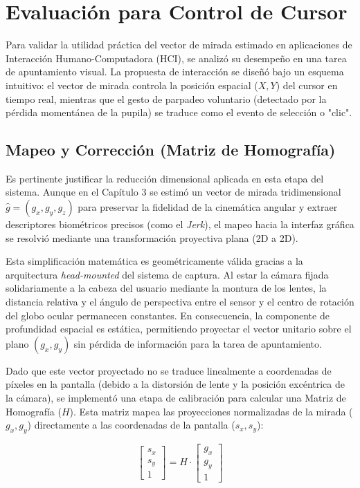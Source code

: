 \section{Evaluación para Control de Cursor}

Para validar la utilidad práctica del vector de mirada estimado en aplicaciones de Interacción Humano-Computadora (HCI), se analizó su desempeño en una tarea de apuntamiento visual.
La propuesta de interacción se diseñó bajo un esquema intuitivo: el vector de mirada controla la posición espacial ($X, Y$) del cursor en tiempo real, mientras que el gesto de parpadeo voluntario (detectado por la pérdida momentánea de la pupila) se traduce como el evento de selección o "clic".

\subsection{Mapeo y Corrección (Matriz de Homografía)}

Es pertinente justificar la reducción dimensional aplicada en esta etapa del sistema. Aunque en el Capítulo 3 se estimó un vector de mirada tridimensional $\hat{g} = (g_x, g_y, g_z)$ para preservar la fidelidad de la cinemática angular y extraer descriptores biométricos precisos (como el \textit{Jerk}), el mapeo hacia la interfaz gráfica se resolvió mediante una transformación proyectiva plana (2D a 2D). 

Esta simplificación matemática es geométricamente válida gracias a la arquitectura \textit{head-mounted} del sistema de captura. Al estar la cámara fijada solidariamente a la cabeza del usuario mediante la montura de los lentes, la distancia relativa y el ángulo de perspectiva entre el sensor y el centro de rotación del globo ocular permanecen constantes. En consecuencia, la componente de profundidad espacial es estática, permitiendo proyectar el vector unitario sobre el plano $(g_x, g_y)$ sin pérdida de información para la tarea de apuntamiento.

Dado que este vector proyectado no se traduce linealmente a coordenadas de píxeles en la pantalla (debido a la distorsión de lente y la posición excéntrica de la cámara), se implementó una etapa de calibración para calcular una Matriz de Homografía ($H$). Esta matriz mapea las proyecciones normalizadas de la mirada ($g_x, g_y$) directamente a las coordenadas de la pantalla ($s_x, s_y$):

\begin{equation}
	\begin{bmatrix} s_x \\ s_y \\ 1 \end{bmatrix} = 
	H \cdot 
	\begin{bmatrix} g_x \\ g_y \\ 1 \end{bmatrix}
\end{equation}

